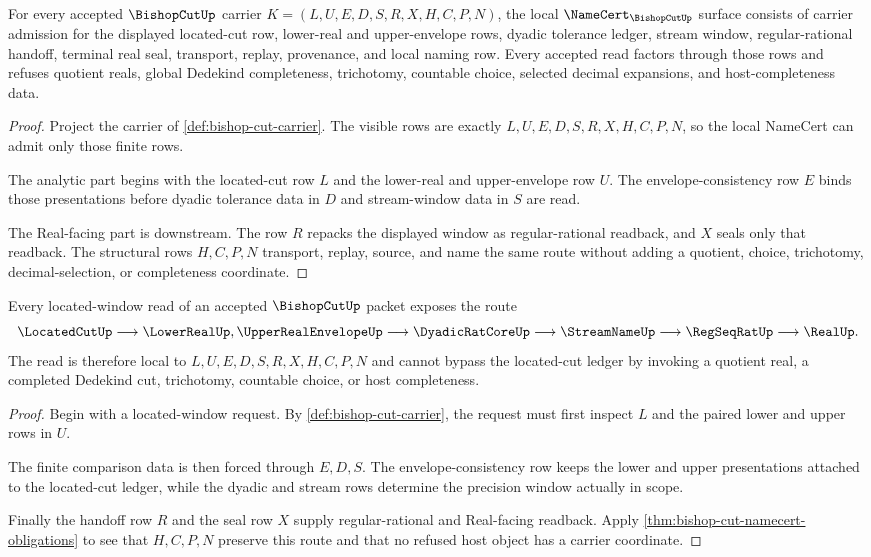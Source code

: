 \begin{theorem}
\label{thm:bishop-cut-namecert-obligations}
For every accepted $\BishopCutUp$ carrier $K=(L,U,E,D,S,R,X,H,C,P,N)$, the local $\NameCert_{\BishopCutUp}$ surface consists of carrier admission for the displayed located-cut row, lower-real and upper-envelope rows, dyadic tolerance ledger, stream window, regular-rational handoff, terminal real seal, transport, replay, provenance, and local naming row. Every accepted read factors through those rows and refuses quotient reals, global Dedekind completeness, trichotomy, countable choice, selected decimal expansions, and host-completeness data.
\end{theorem}
\begin{proof}
Project the carrier of \autoref{def:bishop-cut-carrier}. The visible rows are exactly $L,U,E,D,S,R,X,H,C,P,N$, so the local NameCert can admit only those finite rows.

The analytic part begins with the located-cut row $L$ and the lower-real and upper-envelope row $U$. The envelope-consistency row $E$ binds those presentations before dyadic tolerance data in $D$ and stream-window data in $S$ are read.

The Real-facing part is downstream. The row $R$ repacks the displayed window as regular-rational readback, and $X$ seals only that readback. The structural rows $H,C,P,N$ transport, replay, source, and name the same route without adding a quotient, choice, trichotomy, decimal-selection, or completeness coordinate.
\end{proof}

\begin{theorem}
\label{thm:bishop-cut-located-window}
Every located-window read of an accepted $\BishopCutUp$ packet exposes the route
$$
\LocatedCutUp \longrightarrow \LowerRealUp,\UpperRealEnvelopeUp
  \longrightarrow \DyadicRatCoreUp \longrightarrow \StreamNameUp
  \longrightarrow \RegSeqRatUp \longrightarrow \RealUp .
$$
The read is therefore local to $L,U,E,D,S,R,X,H,C,P,N$ and cannot bypass the located-cut ledger by invoking a quotient real, a completed Dedekind cut, trichotomy, countable choice, or host completeness.
\end{theorem}
\begin{proof}
Begin with a located-window request. By \autoref{def:bishop-cut-carrier}, the request must first inspect $L$ and the paired lower and upper rows in $U$.

The finite comparison data is then forced through $E,D,S$. The envelope-consistency row keeps the lower and upper presentations attached to the located-cut ledger, while the dyadic and stream rows determine the precision window actually in scope.

Finally the handoff row $R$ and the seal row $X$ supply regular-rational and Real-facing readback. Apply \autoref{thm:bishop-cut-namecert-obligations} to see that $H,C,P,N$ preserve this route and that no refused host object has a carrier coordinate.
\end{proof}


